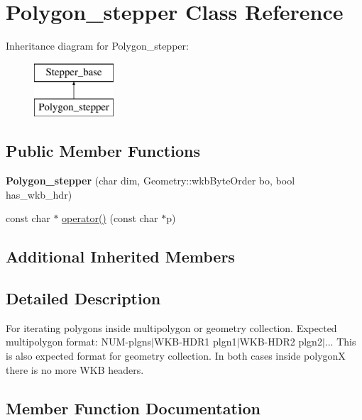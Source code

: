 \hypertarget{classPolygon__stepper}{}\section{Polygon\+\_\+stepper Class Reference}
\label{classPolygon__stepper}
Inheritance diagram for Polygon\+\_\+stepper\+:\begin{figure}[H]
\begin{center}
\leavevmode
\includegraphics[height=2.000000cm]{classPolygon__stepper}
\end{center}
\end{figure}
\subsection*{Public Member Functions}
\begin{DoxyCompactItemize}
\item 
\mbox{\label{classPolygon__stepper_a21df0ac16c8cbfab636fcc8bcdab601b}} 
{\bfseries Polygon\+\_\+stepper} (char dim, Geometry\+::wkb\+Byte\+Order bo, bool has\+\_\+wkb\+\_\+hdr)
\item 
const char $\ast$ \mbox{\hyperlink{classPolygon__stepper_a73b1c201b53a9bb5586e468501ca5337}{operator()}} (const char $\ast$p)
\end{DoxyCompactItemize}
\subsection*{Additional Inherited Members}


\subsection{Detailed Description}
For iterating polygons inside multipolygon or geometry collection. Expected multipolygon format\+: N\+UM-\/plgns$\vert$\+W\+KB-\/H\+D\+R1 plgn1$\vert$\+W\+KB-\/H\+D\+R2 plgn2$\vert$... This is also expected format for geometry collection. In both cases inside polygonX there is no more W\+KB headers. 

\subsection{Member Function Documentation}
\mbox{\label{classPolygon__stepper_a73b1c201b53a9bb5586e468501ca5337}} 
